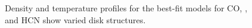 

\begin{figure}%
  \centering
    \hspace*{\fill}%
    \vfill%
    \vfill%
    \hspace*{\fill}%
    \caption{Density and temperature profiles for the best-fit models for CO, \hco, and HCN show varied disk structures.}
    \label{fig:bf_disk_strs}
\end{figure}




